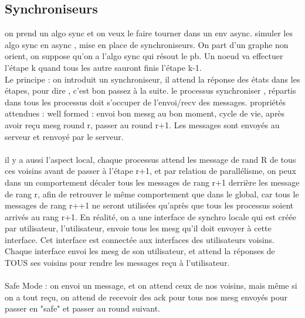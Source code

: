 \documentclass{article}
\begin{document}
\subsection{Synchroniseurs}
on prend un algo sync et on veux le faire tourner dans un env async. simuler les algo sync en async , mise en place de synchroniseurs. On part d'un graphe non orient, on suppose qu'on a l'algo sync qui résout le pb. Un noeud va effectuer l'étape k quand tous les autre sauront finis l'étape k-1.\\Le principe : on introduit un synchroniseur, il attend la réponse des états dans les étapes, pour dire , c'est bon passez à la suite. le processus synchroniser , répartis dans tous les processus doit s'occuper de l'envoi/recv des messages. propriétés attendues : well formed : envoi bon messg au bon moment, cycle de vie, après avoir reçu mesg round r, passer au round r+1. Les messages sont envoyés au serveur et renvoyé par le serveur.\\\\ il y a aussi l'aspect local, chaque processus attend les message de rand R de tous ces voisins avant de passer à l'étape r+1, et par relation de parallélisme, on peux dans un comportement décaler tous les messages de rang r+1 derrière les message de rang r, afin de retrouver le même comportement que dans le global, car tous le messages de rang r++1 ne seront utilisées qu’après que tous les processus soient arrivés au rang r+1. En réalité, on a une interface de synchro locale qui est créée par utilisateur, l'utilisateur, envoie tous les mesg qu'il doit envoyer à cette interface. Cet interface est connectée aux interfaces des utilisateurs voisins. Chaque interface envoi les mesg de son utilisateur, et attend la réponses de TOUS ses voisins pour rendre les messages reçu à l'utilisateur. \\\\Safe Mode : on envoi un message, et on attend ceux de nos voisins,  mais même si on a tout reçu, on attend de recevoir des ack pour tous nos mesg envoyés pour passer en "safe" et passer au round suivant.
\end{document}
